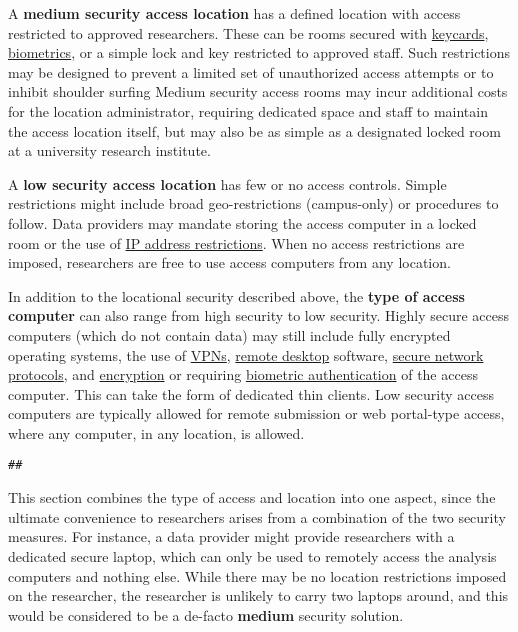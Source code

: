 A \textbf{medium security access location} has a defined location with access restricted to approved researchers. These can be rooms secured with \protect\hyperlink{physical-access-cards}{keycards}, \protect\hyperlink{biometric-authentication}{biometrics}, or a simple lock and key restricted to approved staff. Such restrictions may be designed to prevent a limited set of unauthorized access attempts or to inhibit shoulder surfing Medium security access rooms may incur additional costs for the location administrator, requiring dedicated space and staff to maintain the access location itself, but may also be as simple as a designated locked room at a university research institute.

A \textbf{low security access location} has few or no access controls. Simple restrictions might include broad geo-restrictions (campus-only) or procedures to follow. Data providers may mandate storing the access computer in a locked room or the use of \protect\hyperlink{ip-address-restrictions}{IP address restrictions}. When no access restrictions are imposed, researchers are free to use access computers from any location.

In addition to the locational security described above, the \textbf{type of access computer} can also range from high security to low security. Highly secure access computers (which do not contain data) may still include fully encrypted operating systems, the use of \protect\hyperlink{virtual-private-networks}{VPNs}, \protect\hyperlink{remote-desktop}{remote desktop} software, \protect\hyperlink{secure-network-protocols}{secure network protocols}, and \protect\hyperlink{encryption}{encryption} or requiring \protect\hyperlink{biometric-authentication}{biometric authentication} of the access computer. This can take the form of dedicated thin clients. Low security access computers are typically allowed for remote submission or web portal-type access, where any computer, in any location, is allowed.

\begin{verbatim}
## 
\end{verbatim}

This section combines the type of access and location into one aspect, since the ultimate convenience to researchers arises from a combination of the two security measures. For instance, a data provider might provide researchers with a dedicated secure laptop, which can only be used to remotely access the analysis computers and nothing else. While there may be no location restrictions imposed on the researcher, the researcher is unlikely to carry two laptops around, and this would be considered to be a de-facto \textbf{medium} security solution.

